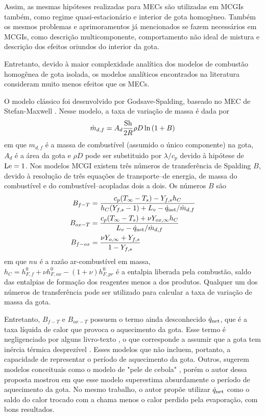 Assim, as mesmas hipóteses realizadas para MECs são utilizadas em MCGIs também, como regime quasi-estacionário e interior de gota homogêneo.
Também os mesmos problemas e aprimoramentos já mencionados se fazem necessários em MCGIs, como descrição multicomponente, comportamento não ideal de mistura e  
descrição dos efeitos oriundos do interior da gota.

Entretanto, devido à maior complexidade analítica dos modelos de combustão homogênea de gota isolada, os modelos analíticos encontrados na literatura consideram muito menos efeitos que os MECs.

O modelo clássico foi desenvolvido por Godsave-Spalding, baseado no MEC de Stefan-Maxwell \cite{Glassman2008,Law2006,Turns2000}.
Nesse modelo, a taxa de variação de massa é dada por
\begin{equation}
    \dot m_{d,f} = A_d \frac{\mathrm{Sh}}{2R} \rho D \ln{(1 + B)} \label{eq:m_evap_B_M_2}
\end{equation}
em que $m_{d,f}$ é a massa de combustível (assumido o único componente) na gota, $A_d$ é a área da gota e $\rho D$ pode ser substituido por $\lambda/c_p$ devido à hipótese de $\mathrm{Le}=1$.
Nos modelos MCGI existem três números de transferência de Spalding $B$, devido à resolução de três equações de transporte--de energia, de massa do combustível e do combustível--acopladas dois a dois.
Os números $B$ são
\begin{align}
    B_{f-T}  &= \frac{c_p(T_\infty - T_s) - Y_{f,s} h_C}{h_C(Y_{f,s} - 1) + L_v - \dot q_{\mathrm{net}}/\dot m_{d,f}} \label{eq:B_fq}\\
    B_{ox-T} &= \frac{c_p(T_\infty - T_s) + \nu Y_{ox,\infty}h_C}{L_v  - \dot q_{\mathrm{net}}/\dot m_{d,f}} \label{eq:B_oq}\\
    B_{f-ox} &= \frac{\nu Y_{o,\infty} + Y_{f,s}}{1 - Y_{f,s}} \label{eq:B_fo}
\end{align}
em que $nu$ é a razão ar-combustível em massa, $h_C=h^0_{F,f} + \nu h^0_{F,ox} - (1+\nu)h^0_{F,pr}$ é a entalpia liberada pela combustão, saldo das entalpias de formação dos reagentes menos a dos produtos.
Qualquer um dos números de transferência pode ser utilizado para calcular a taxa de variação de massa da gota.

Entretanto, $B_{f-T}$ e $B_{ox-T}$ possuem o termo ainda desconhecido $\dot q_{\mathrm{net}}$, que é a taxa líquida de calor que provoca o aquecimento da gota.
Esse termo é negligenciado por alguns livro-texto \cite{Glassman2008,Williams1985}, o que corresponde a assumir que a gota tem inércia térmica desprezível \cite{Turns2000}. 
Esses modelos que não incluem, portanto, a capacidade de representar o  período de aquecimento da gota.
Outros, sugerem modelos conceituais como o modelo de "pele de cebola" \cite[cpt. 10]{Turns2000}, porém o autor dessa proposta mostrou em \cite{HenningsJ2024MT} que esse modelo superestima absurdamente o período de aquecimento da gota.
No mesmo trabalho, o autor propõe utilizar $\dot q_{\mathrm{net}}$ como o saldo do calor trocado com a chama menos o calor perdido pela evaporação, com bons resultados.

